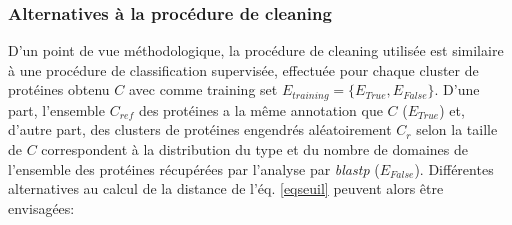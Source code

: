 \subsubsection{Alternatives à la procédure de cleaning} 
	D'un point de vue méthodologique, la procédure de cleaning utilisée est similaire à une procédure de classification supervisée, effectuée pour chaque cluster de protéines obtenu $C$ avec comme training set $E_{training}=\{E_{True},E_{False}\}$. D'une part, l'ensemble $C_{ref}$ des protéines a la même annotation que $C$ ($E_{True}$) et, d'autre part, des clusters de protéines engendrés aléatoirement $C_{r}$ selon la taille de $C$ correspondent à la distribution du type et du nombre de domaines de l'ensemble des protéines récupérées par l'analyse par \textit{blastp} ($E_{False}$). Différentes alternatives au calcul de la distance de l'éq. \ref{eqseuil} peuvent alors être envisagées:
